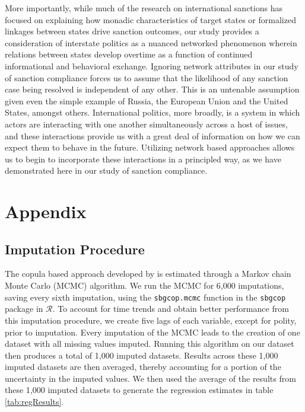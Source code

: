 More importantly, while much of the research on international sanctions has focused on explaining how monadic characteristics of target states or formalized linkages between states drive sanction outcomes, our study provides a consideration of interstate politics as a nuanced networked phenomenon wherein relations between states develop overtime as a function of continued informational and behavioral exchange. Ignoring network attributes in our study of sanction compliance forces us to assume that the likelihood of any sanction case being resolved is independent of any other. This is an untenable assumption given even the simple example of Russia, the European Union and the United States, amongst others. International politics, more broadly, is a system in which actors are interacting with one another simultaneously across a host of issues, and these interactions provide us with a great deal of information on how we can expect them to behave in the future. Utilizing network based approaches allows us to begin to incorporate these interactions in a principled way, as we have demonstrated here in our study of sanction compliance.

\newpage
\section*{Appendix}
\label{appendix}

\subsection*{Imputation Procedure}
\label{appImp}

The copula based approach developed by \citet{hoff:2007} is estimated through a Markov chain Monte Carlo (MCMC) algorithm. We run the MCMC for 6,000 imputations, saving every sixth imputation, using the \texttt{sbgcop.mcmc} function in the \texttt{sbgcop} package in $\mathcal{R}$. To account for time trends and obtain better performance from this imputation procedure, we create five lags of each variable, except for polity, prior to imputation. Every imputation of the MCMC leads to the creation of one dataset with all missing values imputed. Running this algorithm on our dataset then produces a total of 1,000 imputed datasets. Results across these 1,000 imputed datasets are then averaged, thereby accounting for a portion of the uncertainty in the imputed values. We then used the average of the results from these 1,000 imputed datasets to generate the regression estimates in table \ref{tab:regResults}. 

